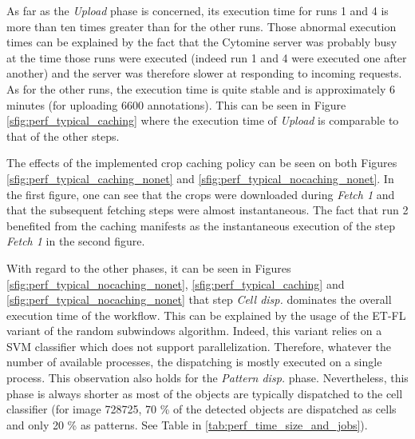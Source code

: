 As far as the \textit{Upload} phase is concerned, its execution time for runs 1 and 4 is more than ten times greater than for the other runs. Those abnormal execution times can be explained by the fact that the Cytomine server was probably busy at the time those runs were executed (indeed run 1 and 4 were executed one after another) and the server was therefore slower at responding to incoming requests. As for the other runs, the execution time is quite stable and is approximately 6 minutes (for uploading 6600 annotations). This can be seen in Figure \ref{sfig:perf_typical_caching} where the execution time of \textit{Upload} is comparable to that of the other steps.  

The effects of the implemented crop caching policy can be seen on both Figures \ref{sfig:perf_typical_caching_nonet} and \ref{sfig:perf_typical_nocaching_nonet}. In the first figure, one can see that the crops were downloaded during \textit{Fetch 1} and that the subsequent fetching steps were almost instantaneous. The fact that run 2 benefited from the caching manifests as the instantaneous execution of the step \textit{Fetch 1} in the second figure.

With regard to the other phases, it can be seen in Figures \ref{sfig:perf_typical_nocaching_nonet}, \ref{sfig:perf_typical_caching} and \ref{sfig:perf_typical_nocaching_nonet} that step \textit{Cell disp.} dominates the overall execution time of the workflow. This can be explained by the usage of the ET-FL variant of the random subwindows algorithm. Indeed, this variant relies on a SVM classifier which does not support parallelization. Therefore, whatever the number of available processes, the dispatching is mostly executed on a single process. This observation also holds for the \textit{Pattern disp.} phase. Nevertheless, this phase is always shorter as most of the objects are typically dispatched to the cell classifier (for image 728725, 70 \% of the detected objects are dispatched as cells and only 20 \% as patterns. See Table in \ref{tab:perf_time_size_and_jobs}). 

